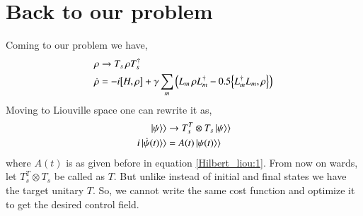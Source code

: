\section{Back to our problem}
Coming to our problem we have,
\begin{align}\label{Hilbert:2}
    \rho &\rightarrow T_{s}\thinspace\rho T_{s}^{\dagger}\\
    \dot{\rho} &= - i\comm{H}{\rho} + \gamma
    \sum_{m} \left(L_{m} \thinspace \rho L_{m}^{\dagger} - 0.5\anticommutator{L_{m}^{\dagger}L_{m}}{ \rho}\right)
\end{align}
Moving to Liouville space one can rewrite it as, 
 \begin{align}\label{Liouville:2}
     \ket{\psi}\rangle &\rightarrow T_{s}^{T} \otimes T_{s}\ket{\psi}\rangle\\
     i\ket{\dot{\psi}(t)}\rangle &= A(t)\ket{\psi(t)}\rangle
 \end{align}
where $A(t)$ is as given before in equation \eqref{Hilbert_liou:1}. From now on wards, let $T_{s}^{T} \otimes T_{s}$ be called as $T$.  But unlike \cite{2018EPJST.227..203S} instead of initial and final states we have the target unitary $T$. So, we cannot write the  same cost function and optimize it to get the desired control field. 
